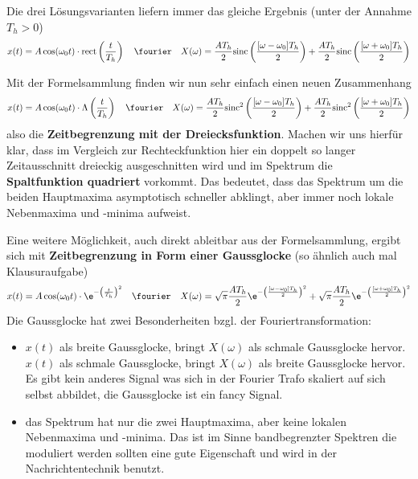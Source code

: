 \begin{Loesung}
Die drei Lösungsvarianten liefern immer das gleiche Ergebnis
(unter der Annahme $T_h>0$)
\begin{equation}
  x(t) = A\cos(\omega_0 t) \cdot \mathrm{rect}\left(\frac{t}{T_h}\right)
  \quad\fourier\quad
  X(\omega) = \frac{A T_h}{2} \mathrm{sinc}\left(\frac{[\omega-\omega_0] T_h}{2}\right) +
  \frac{A T_h}{2} \mathrm{sinc}\left(\frac{[\omega+\omega_0] T_h}{2}\right)
\end{equation}
%

Mit der Formelsammlung finden wir nun sehr einfach einen neuen Zusammenhang
\begin{equation}
  x(t) = A\cos(\omega_0 t) \cdot \mathrm{\Lambda}\left(\frac{t}{T_h}\right)
  \quad\fourier\quad
  X(\omega) = \frac{A T_h}{2} \mathrm{sinc}^2\left(\frac{[\omega-\omega_0] T_h}{2}\right) +
  \frac{A T_h}{2} \mathrm{sinc}^2\left(\frac{[\omega+\omega_0] T_h}{2}\right)
\end{equation}
also die \textbf{Zeitbegrenzung mit der Dreiecksfunktion}. Machen wir uns hierfür klar,
dass im Vergleich zur Rechteckfunktion hier ein doppelt so langer Zeitausschnitt
dreieckig ausgeschnitten wird und
im Spektrum die \textbf{Spaltfunktion quadriert} vorkommt. Das bedeutet, dass das Spektrum
um die beiden Hauptmaxima asymptotisch schneller abklingt, aber immer noch
lokale Nebenmaxima und -minima aufweist.

Eine weitere Möglichkeit, auch direkt ableitbar aus der Formelsammlung, ergibt sich
mit \textbf{Zeitbegrenzung in Form einer Gaussglocke} (so ähnlich auch mal Klausuraufgabe)
\begin{equation}
  x(t) = A\cos(\omega_0 t) \cdot \e^{-\left(\frac{t}{T_h}\right)^2}
  \quad\fourier\quad
  X(\omega) =
  \sqrt{\pi} \frac{A T_h}{2} \e^{-\left(\frac{[\omega-\omega_0] T_h}{2}\right)^2}
  +\sqrt{\pi} \frac{A T_h}{2} \e^{-\left(\frac{[\omega+\omega_0] T_h}{2}\right)^2}
\end{equation}
Die Gaussglocke hat zwei Besonderheiten bzgl. der Fouriertransformation:
\begin{itemize}
  \item $x(t)$ als breite Gaussglocke, bringt $X(\omega)$ als schmale Gaussglocke hervor.
  $x(t)$ als schmale Gaussglocke, bringt $X(\omega)$ als breite Gaussglocke hervor.
  Es gibt kein anderes Signal was sich in der Fourier Trafo skaliert auf sich selbst abbildet,
  die Gaussglocke ist ein fancy Signal.
  \item das Spektrum hat nur die zwei Hauptmaxima, aber keine lokalen Nebenmaxima und -minima.
  Das ist im Sinne bandbegrenzter Spektren die moduliert werden sollten eine gute Eigenschaft
  und wird in der Nachrichtentechnik benutzt.
\end{itemize}


\end{Loesung}






